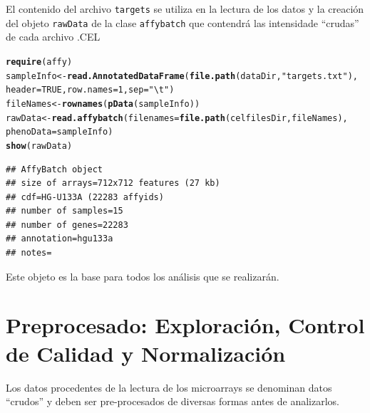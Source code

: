 \documentclass[a4paper]{article}\usepackage[]{graphicx}\usepackage[]{color}
\makeatletter
\newcommand{\hlnum}[1]{\textcolor[rgb]{0.686,0.059,0.569}{#1}}%
\newcommand{\hlstr}[1]{\textcolor[rgb]{0.192,0.494,0.8}{#1}}%
\newcommand{\hlstd}[1]{\textcolor[rgb]{0.345,0.345,0.345}{#1}}%
\newcommand{\hlkwb}[1]{\textcolor[rgb]{0.69,0.353,0.396}{#1}}%
\newcommand{\hlkwc}[1]{\textcolor[rgb]{0.333,0.667,0.333}{#1}}%
\newcommand{\hlkwd}[1]{\textcolor[rgb]{0.737,0.353,0.396}{\textbf{#1}}}%
\newenvironment{kframe}{%
 \def\at@end@of@kframe{}%
 \ifinner\ifhmode%
  \def\at@end@of@kframe{\end{minipage}}%
  \begin{minipage}{\columnwidth}%
 \fi\fi%
 \def\FrameCommand##1{\hskip\@totalleftmargin \hskip-\fboxsep
 \colorbox{shadecolor}{##1}\hskip-\fboxsep
     \hskip-\linewidth \hskip-\@totalleftmargin \hskip\columnwidth}%
 \MakeFramed {\advance\hsize-\width
   \@totalleftmargin\z@ \linewidth\hsize
   \@setminipage}}%
 {\par\unskip\endMakeFramed%
 \at@end@of@kframe}
\newenvironment{knitrout}{}{} %
\makeatother
\begin{document}
El contenido del archivo \texttt{targets} se utiliza en la lectura de los datos y la creación del objeto \texttt{rawData} de la clase \texttt{affybatch} que contendrá las intensidade ``crudas'' de cada archivo .CEL

\begin{knitrout}
\color{fgcolor}\begin{kframe}
\begin{alltt}
\hlkwd{require}\hlstd{(affy)}
\hlstd{sampleInfo} \hlkwb{<-} \hlkwd{read.AnnotatedDataFrame}\hlstd{(}\hlkwd{file.path}\hlstd{(dataDir,}\hlstr{"targets.txt"}\hlstd{),}
    \hlkwc{header} \hlstd{=} \hlnum{TRUE}\hlstd{,} \hlkwc{row.names} \hlstd{=} \hlnum{1}\hlstd{,} \hlkwc{sep}\hlstd{=}\hlstr{"\textbackslash{}t"}\hlstd{)}
\hlstd{fileNames} \hlkwb{<-} \hlkwd{rownames}\hlstd{(}\hlkwd{pData}\hlstd{(sampleInfo))}
\hlstd{rawData} \hlkwb{<-} \hlkwd{read.affybatch}\hlstd{(}\hlkwc{filenames}\hlstd{=}\hlkwd{file.path}\hlstd{(celfilesDir,fileNames),}
                          \hlkwc{phenoData}\hlstd{=sampleInfo)}
\hlkwd{show}\hlstd{(rawData)}
\end{alltt}


{\ttfamily\noindent\color{warningcolor}{\#\# Warning: replacing previous import 'AnnotationDbi::tail' by 'utils::tail' when loading 'hgu133acdf'}}

{\ttfamily\noindent\color{warningcolor}{\#\# Warning: replacing previous import 'AnnotationDbi::head' by 'utils::head' when loading 'hgu133acdf'}}

{\ttfamily\noindent\itshape\color{messagecolor}{\#\# }}\begin{verbatim}
## AffyBatch object
## size of arrays=712x712 features (27 kb)
## cdf=HG-U133A (22283 affyids)
## number of samples=15
## number of genes=22283
## annotation=hgu133a
## notes=
\end{verbatim}
\end{kframe}
\end{knitrout}

Este objeto es la base para todos los análisis que se realizarán.


\section{Preprocesado: Exploración, Control de Calidad y Normalización}

Los datos procedentes de la lectura de los microarrays se denominan datos ``crudos'' y deben ser pre-procesados de diversas formas antes de analizarlos.
\end{document}
